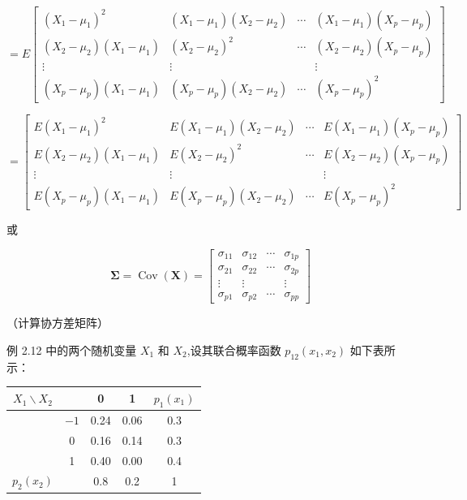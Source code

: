 
\[
=E\begin{bmatrix}
(X_1-\mu_1)^2 & (X_1-\mu_1)(X_2-\mu_2) & \cdots & (X_1-\mu_1)(X_p-\mu_p)\\
(X_2-\mu_2)(X_1-\mu_1) & (X_2-\mu_2)^2 & \cdots & (X_2-\mu_2)(X_p-\mu_p)\\
\vdots & \vdots & & \vdots\\
(X_p-\mu_p)(X_1-\mu_1) & (X_p-\mu_p)(X_2-\mu_2) & \cdots & (X_p-\mu_p)^2
\end{bmatrix}
\]

\[
=\begin{bmatrix}
E(X_1-\mu_1)^2 & E(X_1-\mu_1)(X_2-\mu_2) & \cdots & E(X_1-\mu_1)(X_p-\mu_p)\\
E(X_2-\mu_2)(X_1-\mu_1) & E(X_2-\mu_2)^2 & \cdots & E(X_2-\mu_2)(X_p-\mu_p)\\
\vdots & \vdots & & \vdots\\
E(X_p-\mu_p)(X_1-\mu_1) & E(X_p-\mu_p)(X_2-\mu_2) & \cdots & E(X_p-\mu_p)^2
\end{bmatrix}
\]

或

\label{eq:2-31}
\begin{equation}
\bm{\Sigma}=\operatorname{Cov}(\bm{X})=\begin{bmatrix}
\sigma_{11} & \sigma_{12} & \cdots & \sigma_{1p}\\
\sigma_{21} & \sigma_{22} & \cdots & \sigma_{2p}\\
\vdots & \vdots & & \vdots\\
\sigma_{p1} & \sigma_{p2} & \cdots & \sigma_{pp}
\end{bmatrix} \tag{2-31}
\end{equation}

 （计算协方差矩阵）

例 2.12 中的两个随机变量 $X_1$ 和 $X_2$,设其联合概率函数 $p_{12}(x_1,x_2)$ 如下表所示：

\begin{mvtable}
\begin{tabular}{ccccc}
\toprule
$X_1 \backslash X_2$ & & 0 & 1 & $p_1(x_1)$ \\
\midrule
& $-1$ & 0.24 & 0.06 & 0.3 \\
& 0 & 0.16 & 0.14 & 0.3 \\
& 1 & 0.40 & 0.00 & 0.4 \\
$p_2(x_2)$ & & 0.8 & 0.2 & 1 \\
\bottomrule
\end{tabular}
\end{mvtable}

